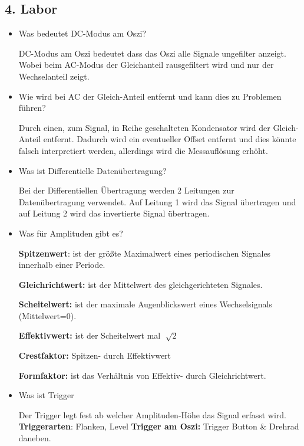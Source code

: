 \documentclass{article}
\begin{document}
\subsection*{4. Labor }
\begin{itemize}
\item Was bedeutet DC-Modus am Oszi? 

DC-Modus am Oszi bedeutet dass das Oszi alle Signale ungefilter anzeigt. Wobei beim AC-Modus der Gleichanteil rausgefiltert wird und nur der Wechselanteil zeigt. 
\item Wie wird bei AC der Gleich-Anteil entfernt und kann dies zu Problemen führen?

Durch einen, zum Signal, in Reihe geschalteten Kondensator wird der Gleich-Anteil entfernt. Dadurch wird ein eventueller Offset entfernt und dies könnte falsch interpretiert werden, allerdings wird die Messauflösung erhöht. 
\item Was ist Differentielle Datenübertragung? 

Bei der Differentiellen Übertragung werden 2 Leitungen zur Datenübertragung verwendet. Auf Leitung 1 wird das Signal übertragen und auf Leitung 2 wird das invertierte Signal übertragen. 
\item Was für Amplituden gibt es? 

\textbf{Spitzenwert}: ist der größte Maximalwert eines periodischen Signales innerhalb einer Periode. 

\textbf{Gleichrichtwert:} ist der Mittelwert des gleichgerichteten Signales. 

\textbf{Scheitelwert: } ist der maximale Augenblickswert eines Wechselsignals (Mittelwert=0). 

\textbf{Effektivwert: } ist der Scheitelwert mal \(\sqrt[]{2}\)

\textbf{Crestfaktor:} Spitzen- durch Effektivwert

\textbf{Formfaktor:} ist das Verhältnis von Effektiv- durch Gleichrichtwert. 
\item Was ist Trigger

Der Trigger legt fest ab welcher Amplituden-Höhe das Signal erfasst wird. 
\textbf{Triggerarten}: Flanken, Level
\textbf{Trigger am Oszi:} Trigger Button \& Drehrad daneben. 


\end{itemize}
\end{document}
